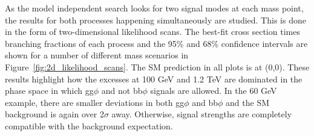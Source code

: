 As the model independent search looks for two signal modes at each mass point, the results for both processes happening simultaneously are studied.
This is done in the form of two-dimensional likelihood scans.
The best-fit cross section times branching fractions of each process and the 95\% and 68\% confidence intervals are shown for a number of different mass scenarios in Figure~\ref{fig:2d_likelihood_scans}.
The \ac{SM} prediction in all plots is at (0,0).
These results highlight how the excesses at 100 GeV and 1.2 TeV are dominated in the phase space in which gg$\phi$ and not bb$\phi$ signals are allowed.
In the 60 GeV example, there are smaller deviations in both gg$\phi$ and bb$\phi$ and the SM background is again over 2$\sigma$ away.
Otherwise, signal strengths are completely compatible with the background expectation.


